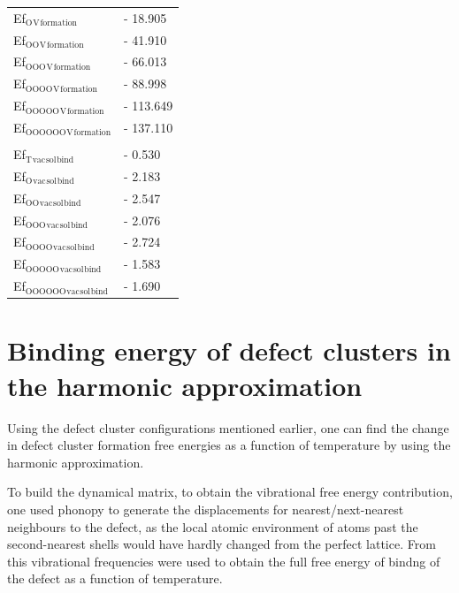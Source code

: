 \documentclass[11pt]{article}
\begin{document}
\begin{center}
\begin{tabular}{ll}
Ef\(_{\text{O}}\)\(_{\text{V}}\)\(_{\text{formation}}\) & -  18.905\\
Ef\(_{\text{OO}}\)\(_{\text{V}}\)\(_{\text{formation}}\) & -  41.910\\
Ef\(_{\text{OOO}}\)\(_{\text{V}}\)\(_{\text{formation}}\) & -  66.013\\
Ef\(_{\text{OOOO}}\)\(_{\text{V}}\)\(_{\text{formation}}\) & -  88.998\\
Ef\(_{\text{OOOOO}}\)\(_{\text{V}}\)\(_{\text{formation}}\) & - 113.649\\
Ef\(_{\text{OOOOOO}}\)\(_{\text{V}}\)\(_{\text{formation}}\) & - 137.110\\
 & \\
Ef\(_{\text{T}}\)\(_{\text{vac}}\)\(_{\text{sol}}\)\(_{\text{bind}}\) & -   0.530\\
Ef\(_{\text{O}}\)\(_{\text{vac}}\)\(_{\text{sol}}\)\(_{\text{bind}}\) & -   2.183\\
Ef\(_{\text{OO}}\)\(_{\text{vac}}\)\(_{\text{sol}}\)\(_{\text{bind}}\) & -   2.547\\
Ef\(_{\text{OOO}}\)\(_{\text{vac}}\)\(_{\text{sol}}\)\(_{\text{bind}}\) & -   2.076\\
Ef\(_{\text{OOOO}}\)\(_{\text{vac}}\)\(_{\text{sol}}\)\(_{\text{bind}}\) & -  2.724\\
Ef\(_{\text{OOOOO}}\)\(_{\text{vac}}\)\(_{\text{sol}}\)\(_{\text{bind}}\) & - 1.583\\
Ef\(_{\text{OOOOOO}}\)\(_{\text{vac}}\)\(_{\text{sol}}\)\(_{\text{bind}}\) & - 1.690\\
\end{tabular}
\end{center}


\section{Binding energy of defect clusters in the harmonic approximation}
\label{sec:org24a7ad6}

Using the defect cluster configurations mentioned earlier, one can
find the change in defect cluster formation free energies as a
function of temperature by using the harmonic approximation. 

To build the dynamical matrix, to obtain the vibrational free energy
contribution, one used phonopy to generate the displacements for nearest/next-nearest
neighbours to the defect, as the local atomic environment of atoms
past the second-nearest shells would have hardly changed from the
perfect lattice. From this vibrational frequencies were used to
obtain the full free energy of bindng of the defect as a function of
temperature. 
\end{document}
